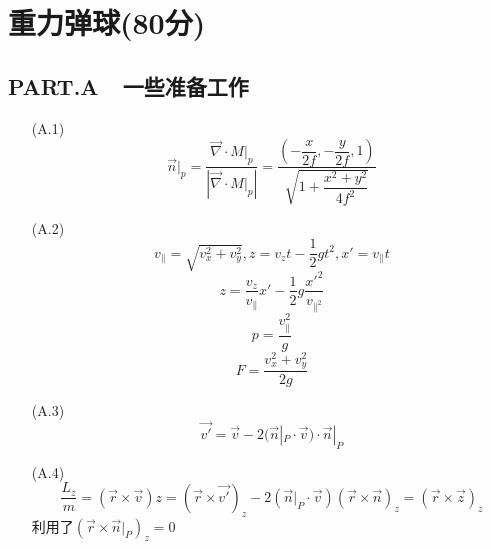 \documentclass{article}
\begin{document}
\section*{重力弹球(80分)}

\subsection*{PART.A\ \ 一些准备工作}
\begin{itemize}
    \item[(A.1)]
    \[\vec{n}|_p=\dfrac{\vec{\nabla}\cdot M|_p}{\left|\vec{\nabla}\cdot M|_p\right|}=\dfrac{(-\dfrac{x}{2f},-\dfrac{y}{2f},1)}{\sqrt{1+\dfrac{x^2+y^2}{4f^2}}}\tag{1}\]
    \item[(A.2)]
    \[v_{\parallel}=\sqrt{v_{x}^{2}+v_{y}^{2}},z=v_z t-\frac{1}{2}gt^{2},x'=v_{\parallel}t\]
    \[z=\frac{v_z}{v_{\parallel}}x'-\dfrac{1}{2}g\dfrac{x'^{2}}{v_{\parallel^2}}\tag{2}\]
    \[p=\frac{v_{\parallel}^{2}}{g}\]
    \[F=\frac{v_x^2+v_y^2}{2g}\tag{3}\]
    \item[(A.3)]
    \[\vec{v'}=\vec{v}-2(\vec{n}|_P\cdot\vec{v})\cdot\vec{n}|_P\tag{4}\]
    \item[(A.4)]
    \[\dfrac{L_z}{m}=(\vec{r}\times\vec{v})z=(\vec{r}\times\vec{v'})_z-2(\vec{n}|_P\cdot\vec{v})(\vec{r}\times\vec{n})_z=(\vec{r}\times\vec{z})_z\tag{5}\]
    利用了$(\vec{r}\times\vec{n}|_P)_z=0$
\end{itemize}
\end{document}
